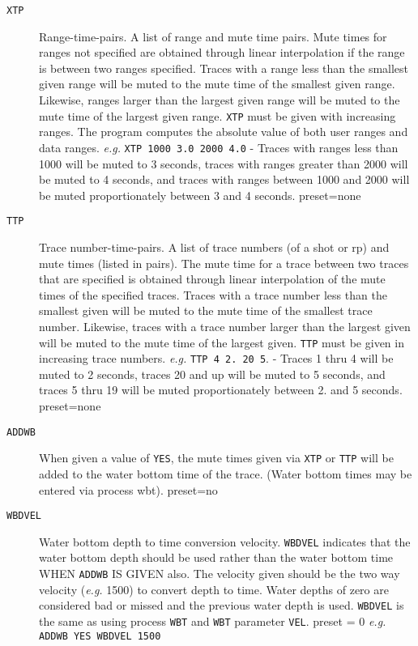 \begin{description}
\item[\texttt{XTP}] Range-time-pairs.  A list of range and mute time pairs.  Mute
         times for ranges not specified are obtained through linear
         interpolation if the range is between two ranges specified.
         Traces with a range less than the smallest given range will be
         muted to the mute time of the smallest given range.  Likewise,
         ranges larger than the largest given range will be muted to the
         mute time of the largest given range.  \texttt{XTP} must be given with
         increasing ranges.  The program computes the absolute value of
         both user ranges and data ranges.  \textit{e.g.}
         \texttt{XTP 1000 3.0 2000 4.0}  - Traces with ranges less than 1000 will
         be muted to 3 seconds, traces with ranges greater than 2000
         will be muted to 4 seconds, and traces with ranges between
         1000 and 2000 will be muted proportionately between 3 and 4
         seconds.
         \Gls{preset}=none

\item[\texttt{TTP}] Trace number-time-pairs.  A list of trace numbers (of a \gls{shot} or
         \gls{rp}) and mute times (listed in pairs).  The mute time for a
         trace between two traces that are specified is obtained through
         linear interpolation of the mute times of the specified traces.
         Traces with a trace number less than the smallest given will be
         muted to the mute time of the smallest trace number.  Likewise,
         traces with a trace number larger than the largest given will
         be muted to the mute time of the largest given.  \texttt{TTP} must be
         given in increasing trace numbers.  \textit{e.g.}
         \texttt{TTP 4 2. 20 5}. - Traces 1 thru 4 will be muted to 2 seconds,
         traces 20 and up will be muted to 5 seconds, and traces 5 thru
         19 will be muted proportionately between 2. and 5 seconds.
         \Gls{preset}=none

\item[\texttt{ADDWB}] When given a value of \texttt{YES}, the mute times given via \texttt{XTP} or \texttt{TTP}
         will be added to the water bottom time of the trace.  (Water
         bottom times may be entered via process wbt).
         \Gls{preset}=no

\item[\texttt{WBDVEL}] Water bottom depth to time conversion velocity.  \texttt{WBDVEL}
         indicates that the water bottom depth should be used rather
         than the water bottom time WHEN \texttt{ADDWB} IS GIVEN also.  The
         velocity given should be the two way velocity (\textit{e.g.} 1500) to
         convert depth to time.  Water depths of zero are considered
         bad or missed and the previous water depth is used.
         \texttt{WBDVEL} is the same as using process \texttt{WBT} and \texttt{WBT} parameter \texttt{VEL}.
         \Gls{preset} = 0     \textit{e.g.}  \texttt{ADDWB YES WBDVEL 1500}


\end{description}
